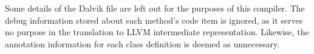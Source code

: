 Some details of the Dalvik file are left out for the purposes of this compiler. The debug information stored about each method's code item is ignored, as it serves no purpose in the translation to LLVM intermediate representation. Likewise, the annotation information for each class definition is deemed as unnecessary.
